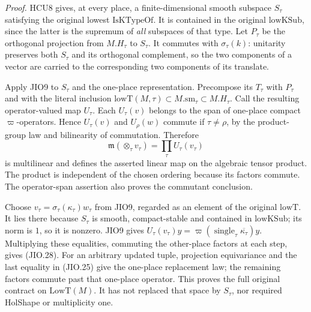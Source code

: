 \emph{Proof.}
HCU8 gives, at every place, a finite-dimensional smooth subspace
\(S_\tau\) satisfying the original lowest \(\mathrm{IsKTypeOf}\).
It is contained in the original \(\mathrm{lowKSub}\), since the
latter is the supremum of \emph{all} subspaces of that type.
Let \(P_\tau\) be the orthogonal projection from \(M.H_\tau\)
to \(S_\tau\).  It commutes with \(\sigma_\tau(k)\):
unitarity preserves both \(S_\tau\) and its orthogonal complement,
so the two components of a vector are carried to the corresponding
two components of its translate.

Apply JIO9 to \(S_\tau\) and the one-place representation.
Precompose its \(T_\tau\) with \(P_\tau\) and with the literal
inclusion
\(\mathrm{lowT}(M,\tau)\subset M.\mathrm{sm}_\tau\subset M.H_\tau\).
Call the resulting operator-valued map \(U_\tau\).
Each \(U_\tau(v)\) belongs to the span of one-place compact
\(\varpi\)-operators.  Hence \(U_\tau(v)\) and \(U_\rho(w)\)
commute if \(\tau\ne\rho\), by the product-group law and
bilinearity of commutation.  Therefore
\[
          \mathfrak m(\otimes_\tau v_\tau)
                           =\prod_\tau U_\tau(v_\tau)
 \tag{JIO.29}
\]
is multilinear and defines the asserted linear map on the
algebraic tensor product.  The product is independent of the
chosen ordering because its factors commute.
The operator-span assertion also proves the commutant conclusion.

Choose \(v_\tau=\sigma_\tau(\kappa_\tau)w_\tau\) from JIO9,
regarded as an element of the original \(\mathrm{lowT}\).
It lies there because \(S_\tau\) is smooth, compact-stable and
contained in \(\mathrm{lowKSub}\); its norm is \(1\), so it is
nonzero.  JIO9 gives
\(U_\tau(v_\tau)y=
 \varpi(\operatorname{single}_\tau\overline{\kappa_\tau})y\).
Multiplying these equalities, commuting the other-place factors
at each step, gives (JIO.28).
For an arbitrary updated tuple, projection equivariance and
the last equality in (JIO.25) give the one-place replacement
law; the remaining factors commute past that one-place operator.
This proves the full original contract on \(\mathrm{LowT}(M)\).
It has not replaced that space by \(S_\tau\), nor required
HolShape or multiplicity one.

